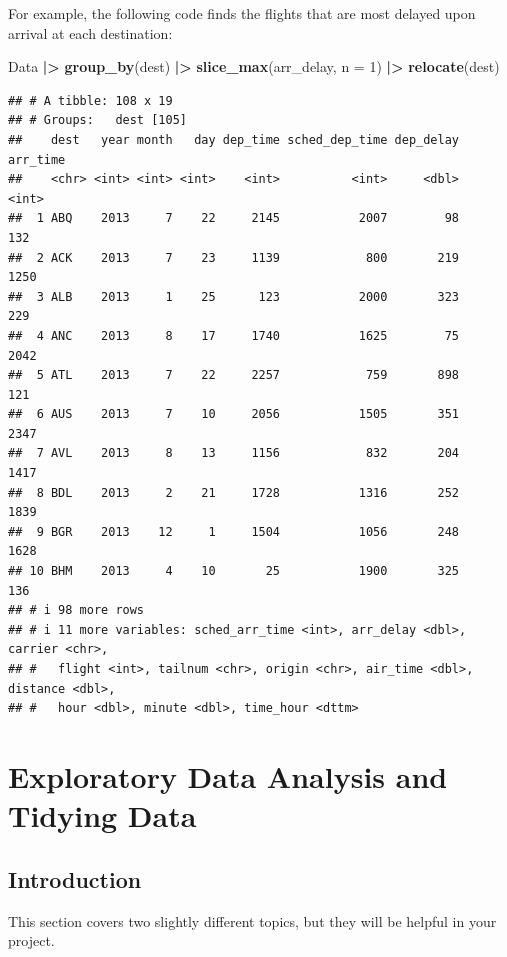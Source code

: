 \documentclass[
]{book}
\newenvironment{Shaded}{\begin{snugshade}}{\end{snugshade}}
\newcommand{\AttributeTok}[1]{\textcolor[rgb]{0.13,0.29,0.53}{#1}}
\newcommand{\DecValTok}[1]{\textcolor[rgb]{0.00,0.00,0.81}{#1}}
\newcommand{\FunctionTok}[1]{\textcolor[rgb]{0.13,0.29,0.53}{\textbf{#1}}}
\newcommand{\NormalTok}[1]{#1}
\newcommand{\SpecialCharTok}[1]{\textcolor[rgb]{0.81,0.36,0.00}{\textbf{#1}}}
\theoremstyle{definition}
\theoremstyle{definition}
\theoremstyle{definition}
\theoremstyle{definition}
\theoremstyle{remark}
\begin{document}
For example, the following code finds the flights that are most delayed upon arrival at each destination:

\begin{Shaded}
\begin{Highlighting}[]
\NormalTok{Data }\SpecialCharTok{|\textgreater{}} 
  \FunctionTok{group\_by}\NormalTok{(dest) }\SpecialCharTok{|\textgreater{}} 
  \FunctionTok{slice\_max}\NormalTok{(arr\_delay, }\AttributeTok{n =} \DecValTok{1}\NormalTok{) }\SpecialCharTok{|\textgreater{}}
  \FunctionTok{relocate}\NormalTok{(dest)}
\end{Highlighting}
\end{Shaded}

\begin{verbatim}
## # A tibble: 108 x 19
## # Groups:   dest [105]
##    dest   year month   day dep_time sched_dep_time dep_delay arr_time
##    <chr> <int> <int> <int>    <int>          <int>     <dbl>    <int>
##  1 ABQ    2013     7    22     2145           2007        98      132
##  2 ACK    2013     7    23     1139            800       219     1250
##  3 ALB    2013     1    25      123           2000       323      229
##  4 ANC    2013     8    17     1740           1625        75     2042
##  5 ATL    2013     7    22     2257            759       898      121
##  6 AUS    2013     7    10     2056           1505       351     2347
##  7 AVL    2013     8    13     1156            832       204     1417
##  8 BDL    2013     2    21     1728           1316       252     1839
##  9 BGR    2013    12     1     1504           1056       248     1628
## 10 BHM    2013     4    10       25           1900       325      136
## # i 98 more rows
## # i 11 more variables: sched_arr_time <int>, arr_delay <dbl>, carrier <chr>,
## #   flight <int>, tailnum <chr>, origin <chr>, air_time <dbl>, distance <dbl>,
## #   hour <dbl>, minute <dbl>, time_hour <dttm>
\end{verbatim}

\hypertarget{EDA}{%
\chapter{Exploratory Data Analysis and Tidying Data}\label{EDA}}

\hypertarget{introduction-1}{%
\section{Introduction}\label{introduction-1}}

This section covers two slightly different topics, but they will be helpful in your project.
\end{document}
